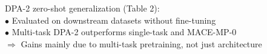 \documentclass[preview]{standalone}
\begin{document}
\begin{center}
DPA-2 zero-shot generalization (Table 2): \\
            $\bullet$ Evaluated on downstream datasets without fine-tuning \\
            $\bullet$ Multi-task DPA-2 outperforms single-task and MACE-MP-0 \\
            $\Rightarrow$ Gains mainly due to multi-task pretraining, not just architecture
\end{center}
\end{document}
